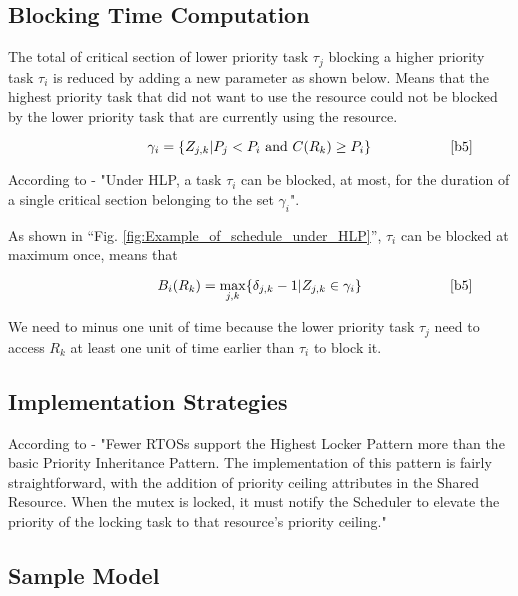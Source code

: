  
\subsection{Blocking Time Computation}

The total of critical section of lower priority task $\tau_{j}$ blocking a higher priority task $\tau_{i}$ is reduced by adding a new parameter as shown below. Means that the highest priority task that did not want to use the resource could not be blocked by the lower priority task that are currently using the resource.

\begin{equation}
\citeequation{\gamma_{i}=\{Z_{j,k} | P_{j}<P_{i} \text{   and } C(R_{k})\geq P_{i} \}}{b5}\label{eq3}
\end{equation}

According to \cite{b5} - "Under HLP, a task $ \tau_{i} $ can be blocked, at most, for the duration of a single critical section belonging to the set $ \gamma_{i} $".  

As shown in ``Fig. \ref{fig:Example_of_schedule_under_HLP}'', $ \tau_{i} $ can be blocked at maximum once, means that

\begin{equation}
\citeequation{B_{i}(R_{k})=\underset{j,k}{\mathrm{max}} \{ \delta_{j,k}-1 | Z_{j,k} \in \gamma_{i}\}}{b5}\label{eq4}  
\end{equation}

We need to minus one unit of time because the lower priority task $ \tau_{j} $ need to access $ R_{k} $ at least one unit of time earlier than $ \tau_{i} $ to block it.

\subsection{Implementation Strategies} 

According to \cite{b6} - "Fewer RTOSs support the Highest Locker Pattern more than the basic Priority Inheritance Pattern. The implementation of this pattern  is fairly straightforward, with the addition of priority ceiling attributes in the Shared Resource. When the mutex is locked, it must notify the Scheduler to elevate the priority of the locking task to that resource's priority ceiling."

\subsection{Sample Model} 

